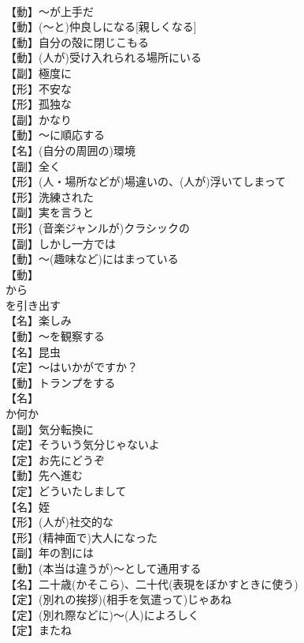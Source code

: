 \documentclass[8pt]{extreport}
\begin{document}
\begin{CJK}{UTF8}{min}
\\	【動】～が上手だ
\\	【動】(～と)仲良しになる[親しくなる]
\\	【動】自分の殻に閉じこもる
\\	【動】(人が)受け入れられる場所にいる
\\	【副】極度に
\\	【形】不安な
\\	【形】孤独な
\\	【副】かなり
\\	【動】～に順応する
\\	【名】(自分の周囲の)環境
\\	【副】全く
\\	【形】(人・場所などが)場違いの、(人が)浮いてしまって
\\	【形】洗練された
\\	【副】実を言うと
\\	【形】(音楽ジャンルが)クラシックの
\\	【副】しかし一方では
\\	【動】～(趣味など)にはまっている
\\	【動】
\\	から
\\	を引き出す
\\	【名】楽しみ
\\	【動】～を観察する
\\	【名】昆虫
\\	【定】～はいかがですか？
\\	【動】トランプをする
\\	【名】
\\	か何か
\\	【副】気分転換に
\\	【定】そういう気分じゃないよ
\\	【定】お先にどうぞ
\\	【動】先へ進む
\\	【定】どういたしまして
\\	【名】姪
\\	【形】(人が)社交的な
\\	【形】(精神面で)大人になった
\\	【副】年の割には
\\	【動】(本当は違うが)～として通用する
\\	【名】二十歳(かそこら)、二十代(表現をぼかすときに使う)
\\	【定】(別れの挨拶)(相手を気遣って)じゃあね
\\	【定】(別れ際などに)～(人)によろしく
\\	【定】またね

\end{CJK}
\end{document}
